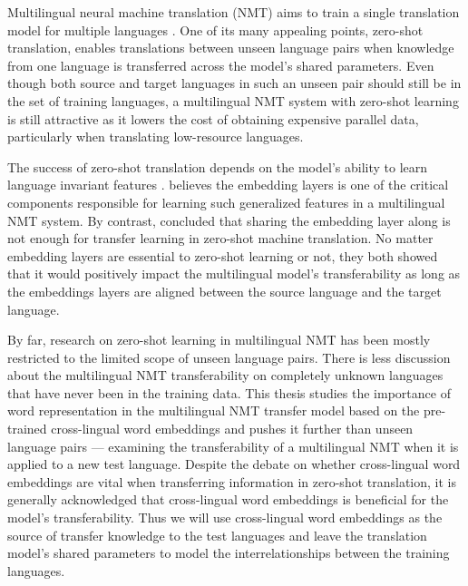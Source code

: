 \documentclass[thesis,fonts=libertine]{cluu}
\begin{document}
Multilingual neural machine translation (NMT) aims to train a single translation model for multiple languages \parencite{Johnson:2016aa,aharoni-etal-2019-massively}. One of its many appealing points, zero-shot translation, enables translations between unseen language pairs when knowledge from one language is transferred across the model's shared parameters. Even though both source and target languages in such an unseen pair should still be in the set of training languages, a multilingual NMT system with zero-shot learning is still attractive as it lowers the cost of obtaining expensive parallel data, particularly when translating low-resource languages.

The success of zero-shot translation depends on the model's ability to learn language invariant features \parencite{Arivazhagan:2019aa}. \textcite{Kim:2019aa} believes the embedding layers is one of the critical components responsible for learning such generalized features in a multilingual NMT system. By contrast, \textcite{aji-etal-2020-neural} concluded that sharing the embedding layer along is not enough for transfer learning in zero-shot machine translation. No matter embedding layers are essential to zero-shot learning or not, they both showed that it would positively impact the multilingual model's transferability as long as the embeddings layers are aligned between the source language and the target language.

By far, research on zero-shot learning in multilingual NMT has been mostly restricted to the limited scope of unseen language pairs. There is less discussion about the multilingual NMT transferability on completely unknown languages that have never been in the training data. This thesis studies the importance of word representation in the multilingual NMT transfer model based on the pre-trained cross-lingual word embeddings \parencite{Bojanowski:2016aa,Ammar:2016aa,Joulin:2018aa,Ruder:2019aa} and pushes it further than unseen language pairs --- examining the transferability of a multilingual NMT when it is applied to a new test language. Despite the debate on whether cross-lingual word embeddings are vital when transferring information in zero-shot translation, it is generally acknowledged that cross-lingual word embeddings is beneficial for the model's transferability. Thus we will use cross-lingual word embeddings as the source of transfer knowledge to the test languages and leave the translation model's shared parameters to model the interrelationships between the training languages.
\end{document}
